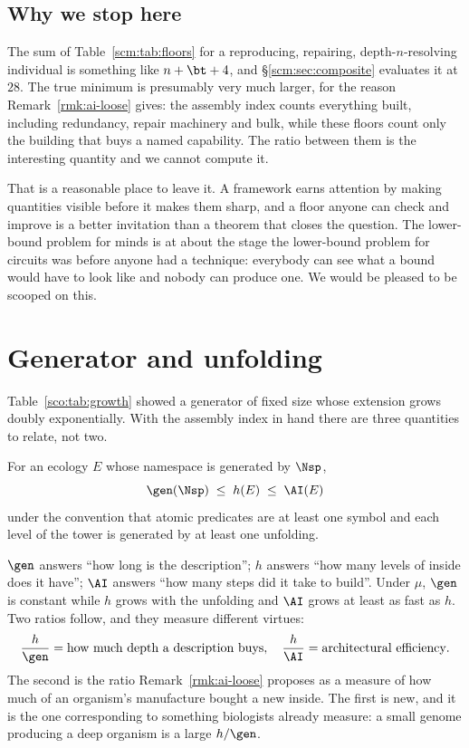\subsection{Why we stop here}

The sum of Table~\ref{scm:tab:floors} for a reproducing, repairing,
depth-$n$-resolving individual is something like $n + \bt + 4$, and
\S\ref{scm:sec:composite} evaluates it at $28$. The true minimum is
presumably very much larger, for the reason
Remark~\ref{rmk:ai-loose} gives: the assembly index counts everything
built, including redundancy, repair machinery and bulk, while these floors
count only the building that buys a named capability. The ratio between
them is the interesting quantity and we cannot compute it.

That is a reasonable place to leave it. A framework earns attention by
making quantities visible before it makes them sharp, and a floor anyone
can check and improve is a better invitation than a theorem that closes
the question. The lower-bound problem for minds is at about the stage the
lower-bound problem for circuits was before anyone had a technique:
everybody can see what a bound would have to look like and nobody can
produce one. We would be pleased to be scooped on this.

\section{Generator and unfolding}
\label{scm:sec:gen}

Table~\ref{sco:tab:growth} showed a generator of fixed size whose
extension grows doubly exponentially. With the assembly index in hand
there are three quantities to relate, not two.

\begin{proposition}
\label{scm:prop:chain}
For an ecology $E$ whose namespace is generated by $\Nsp$,
\[
  \gen(\Nsp) \;\le\; h(E) \;\le\; \AI(E)
\]
under the convention that atomic predicates are at least one symbol and
each level of the tower is generated by at least one unfolding.
\end{proposition}

\begin{remark}
\label{scm:rmk:three}
$\gen$ answers ``how long is the description''; $h$ answers ``how many
levels of inside does it have''; $\AI$ answers ``how many steps did it
take to build''. Under $\mu$, $\gen$ is constant while $h$ grows with the
unfolding and $\AI$ grows at least as fast as $h$. Two ratios follow, and
they measure different virtues:
\[
  \frac{h}{\gen} = \text{how much depth a description buys},
  \quad
  \frac{h}{\AI} = \text{architectural efficiency}.
\]
The second is the ratio Remark~\ref{rmk:ai-loose} proposes as a measure of
how much of an organism's manufacture bought a new inside. The first is
new, and it is the one corresponding to something biologists already
measure: a small genome producing a deep organism is a large $h/\gen$.
\end{remark}

